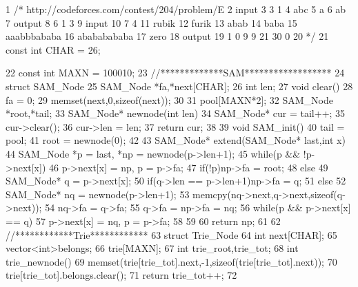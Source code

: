 \documentclass[11pt]{article}
\begin{document}
\begin{Code}
 1   /* http://codeforces.com/contest/204/problem/E
 2   input
 3   3 1
 4   abc
 5   a
 6   ab
 7   output
 8   6 1 3
 9   input
10   7 4
11   rubik
12   furik
13   abab
14   baba
15   aaabbbababa
16   abababababa
17   zero
18   output
19   1 0 9 9 21 30 0
20     */
21   const int CHAR = 26;


22   const int MAXN = 100010;
23   //*************SAM******************
24   struct SAM_Node{
25       SAM_Node *fa,*next[CHAR];
26       int len;
27       void clear(){
28           fa = 0;
29           memset(next,0,sizeof(next));
30       }
31   }pool[MAXN*2];
32   SAM_Node *root,*tail;
33   SAM_Node* newnode(int len){
34       SAM_Node* cur = tail++;
35       cur->clear();
36       cur->len = len;
37       return cur;
38   }
39   void SAM_init(){
40       tail = pool;
41       root = newnode(0);
42   }
43   SAM_Node* extend(SAM_Node* last,int x){
44       SAM_Node *p = last, *np = newnode(p->len+1);
45       while(p && !p->next[x])
46           p->next[x] = np, p = p->fa;
47       if(!p)np->fa = root;
48       else {
49           SAM_Node* q = p->next[x];
50           if(q->len == p->len+1)np->fa = q;
51           else {
52                SAM_Node* nq = newnode(p->len+1);
53                memcpy(nq->next,q->next,sizeof(q->next));
54                nq->fa = q->fa;
55                q->fa = np->fa = nq;
56                while(p && p->next[x] == q)
57                    p->next[x] = nq, p = p->fa;
58           }
59       }
60       return np;
61   }
62   //************Trie************
63   struct Trie_Node{
64       int next[CHAR];
65       vector<int>belongs;
66   }trie[MAXN];
67   int trie_root,trie_tot;
68   int trie_newnode(){
69       memset(trie[trie_tot].next,-1,sizeof(trie[trie_tot].next));
70       trie[trie_tot].belongs.clear();
71       return trie_tot++;
72   }



\end{Code}
\end{document}
